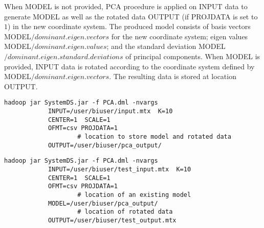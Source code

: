 When MODEL is not provided, PCA procedure is applied on INPUT data to generate MODEL as well as the rotated data OUTPUT (if PROJDATA is set to $1$) in the new coordinate system. 
The produced model consists of basis vectors MODEL$/dominant.eigen.vectors$ for the new coordinate system; eigen values MODEL$/dominant.eigen.values$; and the standard deviation MODEL$/dominant.eigen.standard.deviations$ of principal components.
When MODEL is provided, INPUT data is rotated according to the coordinate system defined by MODEL$/dominant.eigen.vectors$. The resulting data is stored at location OUTPUT.
\\


\begin{verbatim}
hadoop jar SystemDS.jar -f PCA.dml -nvargs 
            INPUT=/user/biuser/input.mtx  K=10
            CENTER=1  SCALE=1
            OFMT=csv PROJDATA=1
				    # location to store model and rotated data
            OUTPUT=/user/biuser/pca_output/   
\end{verbatim}

\begin{verbatim}
hadoop jar SystemDS.jar -f PCA.dml -nvargs 
            INPUT=/user/biuser/test_input.mtx  K=10
            CENTER=1  SCALE=1
            OFMT=csv PROJDATA=1
				    # location of an existing model
            MODEL=/user/biuser/pca_output/       
				    # location of rotated data
            OUTPUT=/user/biuser/test_output.mtx  
\end{verbatim}



